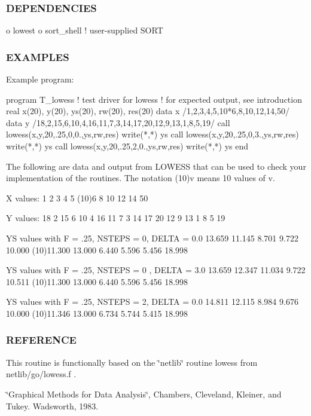 \subsubsection*{D\+E\+P\+E\+N\+D\+E\+N\+C\+I\+ES}

o lowest o sort\+\_\+shell ! user-\/supplied S\+O\+RT

\subsubsection*{E\+X\+A\+M\+P\+L\+ES}

Example program\+: \begin{DoxyVerb}program T_lowess
!  test driver for lowess
!  for expected output, see introduction
real x(20), y(20), ys(20), rw(20), res(20)
data x /1,2,3,4,5,10*6,8,10,12,14,50/
data y /18,2,15,6,10,4,16,11,7,3,14,17,20,12,9,13,1,8,5,19/
call lowess(x,y,20,.25,0,0.,ys,rw,res)
write(*,*) ys
call lowess(x,y,20,.25,0,3.,ys,rw,res)
write(*,*) ys
call lowess(x,y,20,.25,2,0.,ys,rw,res)
write(*,*) ys
end

The following are data and output from LOWESS that can
be used to check your implementation of the routines. The
notation (10)v means 10 values of v.

 X values:
   1  2  3  4  5  (10)6  8  10  12  14  50

 Y values:
    18  2  15  6  10  4  16  11  7  3  14  17  20  12  9  13  1  8  5  19

 YS values with F = .25, NSTEPS = 0, DELTA = 0.0
  13.659  11.145  8.701  9.722  10.000  (10)11.300  13.000  6.440  5.596
    5.456  18.998

 YS values with F = .25, NSTEPS = 0 ,  DELTA = 3.0
   13.659  12.347  11.034  9.722  10.511  (10)11.300  13.000  6.440  5.596
     5.456  18.998

 YS values with F = .25, NSTEPS = 2, DELTA = 0.0
   14.811  12.115  8.984  9.676  10.000  (10)11.346  13.000  6.734  5.744
   5.415  18.998
\end{DoxyVerb}


\subsubsection*{R\+E\+F\+E\+R\+E\+N\+CE}

This routine is functionally based on the \char`\"{}netlib\char`\"{} routine lowess from netlib/go/lowess.\+f .

\char`\"{}\+Graphical Methods for Data Analysis\char`\"{}, Chambers, Cleveland, Kleiner, and Tukey. Wadsworth, 1983.

